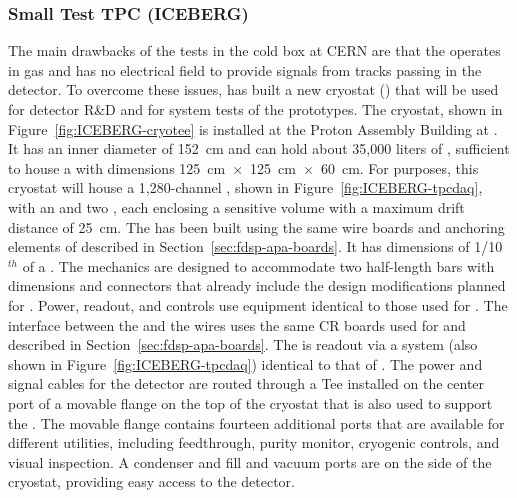 \subsubsection{Small Test TPC (ICEBERG)}
\label{sec:fdsp-tpcelec-qa-facilities-testtpc}

The main drawbacks of the tests in the cold box at CERN are that the 
operates in gas and has no electrical field to 
provide signals from tracks passing in the detector. To overcome these 
issues,  has built a new cryostat () that will be used for 
 detector R\&D and for system tests of the  prototypes. 
The  cryostat, shown in Figure~\ref{fig:ICEBERG-cryotee} is installed
at the Proton Assembly Building at . It has an inner diameter of \SI{152}{cm}
and can hold about 35,000 liters of , sufficient to house a
 with dimensions \SI{125}{cm}~$\times$~\SI{125}{cm}~$\times$~\SI{60}{cm}. For  
purposes, this cryostat will house a 1,280-channel , shown in
Figure~\ref{fig:ICEBERG-tpcdaq}, with an  and two , each 
enclosing a sensitive volume with a maximum drift distance of \SI{25}{cm}. The  
has been built using the same wire boards and anchoring elements of   
described in Section~\ref{sec:fdsp-apa-boards}. It has dimensions of 
1/10$^{th}$ of a  . The  mechanics are designed to accommodate 
two half-length  bars with dimensions and connectors that already 
include the design modifications planned for . Power, readout, and controls 
use equipment identical to those used for . The interface between the 
 and the  wires uses the same CR boards used 
for  and described in Section~\ref{sec:fdsp-apa-boards}. The  is
readout via a  system (also shown in Figure~\ref{fig:ICEBERG-tpcdaq})
identical to that of . The power and signal cables for the detector 
are routed through a Tee installed on the center port of a movable flange on the 
top of the cryostat that is also used to support the . The movable 
flange contains fourteen additional ports that are available for different utilities, 
including  feedthrough, purity monitor, cryogenic controls, and visual inspection. 
A condenser and  fill and vacuum ports are on the side of the cryostat, 
providing easy access to the detector.

